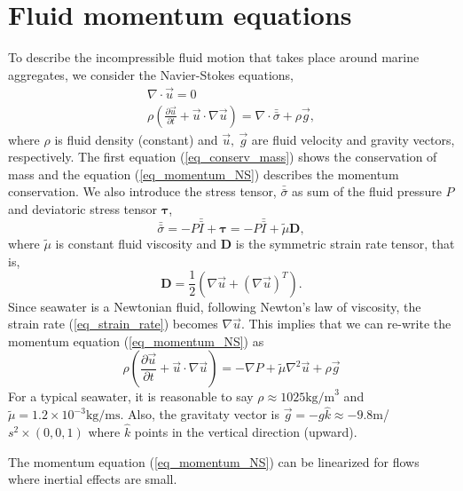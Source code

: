 \section{Fluid momentum equations}
To describe the incompressible fluid motion that takes place around marine aggregates, we consider the Navier-Stokes equations,
\begin{align}
\nabla \cdot \vec{u} = 0 
\label{eq_conserv_mass} \\
\rho 
\left( 
   \frac{\partial \vec{u}}{\partial t} + \vec{u}\cdot \nabla \vec{u}
\right)
  = \nabla \cdot \bar{\bar{\sigma}} +  \rho  \vec{g} ,
\label{eq_momentum_NS}
\end{align}
where $ \rho$ is fluid density (constant) and $\vec{u}, \ \vec{g}$ are fluid velocity and gravity vectors, respectively.
The first equation (\ref{eq_conserv_mass}) shows the conservation of mass and the equation (\ref{eq_momentum_NS}) describes the momentum conservation. 
We also introduce the stress tensor, $\bar{\bar{\sigma}}$ as sum of the fluid pressure $P$ and deviatoric stress tensor $\bm{\tau}$,
\begin{equation}
   \bar{\bar{\sigma}} =-P \bar{\bar{I}} + {\bm \tau} = -P \bar{\bar{I}} + {\tilde{\mu}} {\bm D},
   \label{eq_stress_tensor}
\end{equation}
where ${\tilde{\mu}}$ is constant fluid viscosity and ${\bm D}$ is the symmetric strain rate tensor, that is,
\begin{equation}
   \boldsymbol{D} = \frac{1}{2} \left( \nabla \vec{u} + {(\nabla  \vec{u} )}^T \right).
   \label{eq_strain_rate}
   \end{equation}
Since seawater is a Newtonian fluid, following Newton's law of viscosity, the strain rate (\ref{eq_strain_rate}) becomes $\nabla \vec{u}$. This implies that we can re-write the momentum equation (\ref{eq_momentum_NS}) as
\begin{equation}
  \rho \left( 
   \frac{\partial \vec{u}}{\partial t} + \vec{u}\cdot \nabla \vec{u}
\right)
  = -\nabla P  + {\tilde{\mu}} \nabla^2 \vec{u}+  \rho  \vec{g} 
  \label{eq_stokes_momentum}
\end{equation}
For a typical seawater, it is reasonable to say $\rho \approx 1025 \text{kg/m}^3$ and ${\tilde{\mu}} = 1.2 \times 10^{-3}\text{kg}/\text{ms}$.
Also, the gravitaty vector is $\vec{g} = - g\hat{k} \approx -9.8$m/$s^2 \times (0,0,1)$ where $\hat{k}$ points in the vertical direction (upward). 
\par
 The momentum equation (\ref{eq_momentum_NS}) can be linearized for flows where inertial effects are small. 
